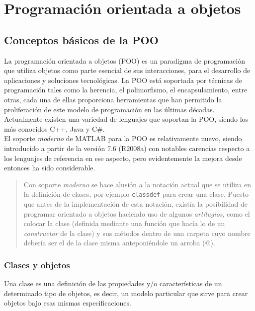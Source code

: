 \chapter{Programación orientada a objetos}

\section{Conceptos básicos de la POO}

La programación orientada a objetos (POO) es un paradigma de programación que utiliza 
objetos como parte esencial de sus interacciones, para el desarrollo de aplicaciones y 
soluciones tecnológicas. La POO está soportada por técnicas de programación tales como 
la herencia, el polimorfismo, el encapsulamiento, entre otras, cada una de ellas 
proporciona herramientas que han permitido la proliferación de este modelo de programación 
en las últimas décadas. Actualmente existen una variedad de lenguajes que soportan la POO, 
siendo los más conocidos C++, Java y C#.\\

El soporte \textit{moderno} de MATLAB para la POO es relativamente nuevo, siendo 
introducido a partir de la versión 7.6 (R2008a) con notables carencias respecto a los 
lenguajes de referencia en ese aspecto, pero evidentemente la mejora desde entonces 
ha sido considerable.\\

\begin{quote}
Con soporte \textit{moderno} se hace alusión a la notación actual que se utiliza en la definición 
de clases, por ejemplo \texttt{classdef} para crear una clase. Puesto que antes de la implementación 
de esta notación, existía la posibilidad de programar orientado a objetos haciendo uso de algunos 
\textit{artilugios}, como el colocar la clase (definida mediante una función que hacía lo de un 
\textit{constructor} de la clase) y sus métodos dentro de una carpeta cuyo nombre debería ser 
el de la clase misma anteponiéndole un arroba (@). 
\end{quote}

\subsection{Clases y objetos}

Una clase es una definición de las propiedades y/o características de un determinado tipo 
de objetos, es decir, un modelo particular que sirve para crear objetos bajo esas 
mismas especificaciones.\\ 

